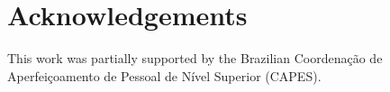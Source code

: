 \section*{Acknowledgements}
This work was partially supported by the Brazilian Coordenação de Aperfeiçoamento de Pessoal de Nível Superior (CAPES). 